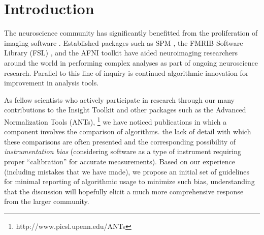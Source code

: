 \documentclass[final,5p,times,twocolumn]{elsarticle}
\begin{document}








\section{Introduction}
The neuroscience community has significantly benefitted from the proliferation
of imaging software .
Established packages such as SPM \cite{Ashburner2012},
the FMRIB Software Library (FSL) \cite{Jenkinson2012},  and
the AFNI toolkit \cite{cox2012} have aided neuroimaging researchers 
around the world in performing complex analyses as part of 
ongoing neuroscience research.  Parallel to this line of
inquiry is continued algorithmic innovation for improvement
in analysis tools.  

As fellow scientists who actively participate in  
research through our many contributions to the Insight
Toolkit \added[id=tr]{[REF]} and other packages such as the Advanced Normalization Tools (ANTs),%
\footnote{
http://www.picsl.upenn.edu/ANTs
} 
we have noticed  publications in which a 
component involves the comparison of algorithms.   the lack of detail with which these comparisons are
often presented and the corresponding possibility of {\it instrumentation
bias} \cite{sackett1979} (considering software  as a type of 
instrument requiring proper ``calibration'' for accurate measurements).  
Based on our experience (including mistakes that we  have made), 
we propose an initial set of guidelines for minimal
reporting of algorithmic usage to minimize such bias, understanding that 
the discussion will hopefully 
elicit a much more comprehensive response from the larger community.
\end{document}
